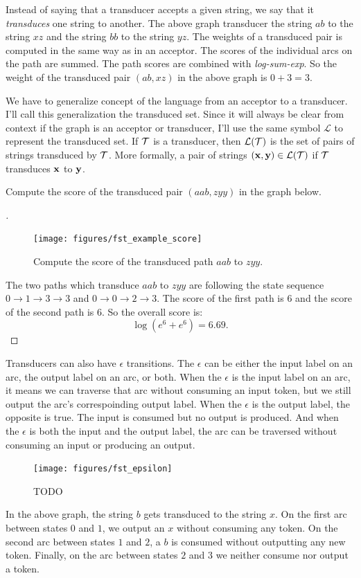 \documentclass[main.tex]{subfiles}
\begin{document}
Instead of saying that a transducer accepts a given string, we say that it
\emph{transduces} one string to another. The above graph transducer the string
$ab$ to the string $xz$ and the string $bb$ to the string $yz$. The weights of
a transduced pair is computed in the same way as in an acceptor. The scores of
the individual arcs on the path are summed. The path scores are combined with
\emph{log-sum-exp}. So the weight of the transduced pair $(ab, xz)$ in the
above graph is $0+3 = 3$.

We have to generalize concept of the language from an acceptor to a transducer.
I'll call this generalization the transduced set. Since it will always be clear
from context if the graph is an acceptor or transducer, I'll use the same
symbol $\mathcal{L}$ to represent the transduced set. If $\mathcal{T}$ is a transducer,
then $\mathcal{L}(\mathcal{T})$ is the set of pairs of strings transduced by $\mathcal{T}$.
More formally, a pair of strings $({\bf x}, {\bf y}) \in \mathcal{L}(\mathcal{T})$ if $\mathcal{T}$
transduces ${\bf x}$ to ${\bf y}$.

\begin{example}
Compute the score of the transduced pair $(aab, zyy)$ in the graph below.
\end{example}

\begin{proof}[\unskip\nopunct]
\begin{figure}
    \centering
    \texttt{[image: figures/fst\_example\_score]}
    \caption{Compute the score of the transduced path $aab$ to $zyy$.}
    \label{fig:fst_example_score}
\end{figure}

The two paths which transduce $aab$ to $zyy$ are following the state sequence
$0 \rightarrow 1 \rightarrow 3 \rightarrow 3$ and $0 \rightarrow 0 \rightarrow
2 \rightarrow 3$. The score of the first path is $6$ and the score of the
second path is $6$. So the overall score is:
$$
\log \left(e^6 + e^6\right) = 6.69.
$$
\end{proof}

Transducers can also have $\epsilon$ transitions. The $\epsilon$ can be either
the input label on an arc, the output label on an arc, or both. When the
$\epsilon$ is the input label on an arc, it means we can traverse that arc
without consuming an input token, but we still output the arc's correspoinding
output label. When the $\epsilon$ is the output label, the opposite is true.
The input is consumed but no output is produced. And when the $\epsilon$ is
both the input and the output label, the arc can be traversed without consuming
an input or producing an output.

\begin{figure}
    \centering
    \texttt{[image: figures/fst\_epsilon]}
    \caption{TODO}
    \label{fig:fst_epsilon}
\end{figure}

In the above graph, the string $b$ gets transduced to the string $x$. On the
first arc between states $0$ and $1$, we output an $x$ without consuming any
token. On the second arc between states $1$ and $2$, a $b$ is consumed without
outputting any new token. Finally, on the arc between states $2$ and $3$ we
neither consume nor output a token.
\end{document}
